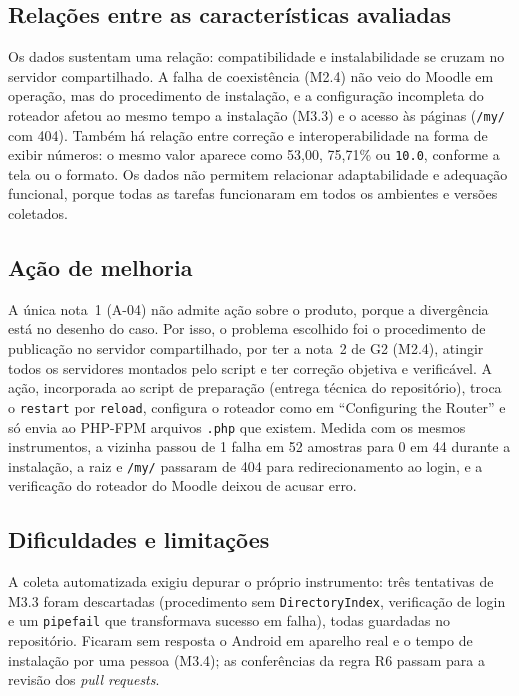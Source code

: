 \documentclass[12pt]{article}
\begin{document}
\subsection{Relações entre as características avaliadas}

Os dados sustentam uma relação: compatibilidade e instalabilidade se cruzam no servidor compartilhado. A falha de coexistência (M2.4) não veio do Moodle em operação, mas do procedimento de instalação, e a configuração incompleta do roteador afetou ao mesmo tempo a instalação (M3.3) e o acesso às páginas (\texttt{/my/} com 404). Também há relação entre correção e interoperabilidade na forma de exibir números: o mesmo valor aparece como 53,00, 75,71\% ou \texttt{10.0}, conforme a tela ou o formato. Os dados não permitem relacionar adaptabilidade e adequação funcional, porque todas as tarefas funcionaram em todos os ambientes e versões coletados.

\subsection{Ação de melhoria}

A única nota~1 (A-04) não admite ação sobre o produto, porque a divergência está no desenho do caso. Por isso, o problema escolhido foi o procedimento de publicação no servidor compartilhado, por ter a nota~2 de G2 (M2.4), atingir todos os servidores montados pelo script e ter correção objetiva e verificável. A ação, incorporada ao script de preparação (entrega técnica do repositório), troca o \texttt{restart} por \texttt{reload}, configura o roteador como em ``Configuring the Router'' e só envia ao PHP-FPM arquivos \texttt{.php} que existem. Medida com os mesmos instrumentos, a vizinha passou de 1 falha em 52 amostras para 0 em 44 durante a instalação, a raiz e \texttt{/my/} passaram de 404 para redirecionamento ao login, e a verificação do roteador do Moodle deixou de acusar erro.

\subsection{Dificuldades e limitações}

A coleta automatizada exigiu depurar o próprio instrumento: três tentativas de M3.3 foram descartadas (procedimento sem \texttt{DirectoryIndex}, verificação de login e um \texttt{pipefail} que transformava sucesso em falha), todas guardadas no repositório. Ficaram sem resposta o Android em aparelho real e o tempo de instalação por uma pessoa (M3.4); as conferências da regra R6 passam para a revisão dos \emph{pull requests}.
\end{document}

